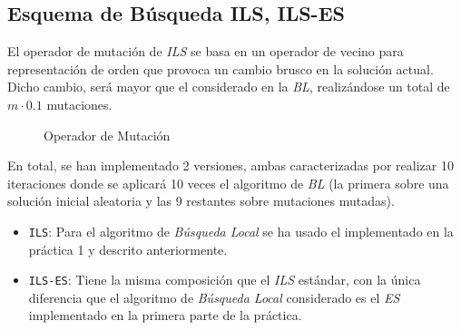 \subsection{Esquema de Búsqueda ILS, ILS-ES}



El operador de mutación de \textit{ILS} se basa en un operador de vecino para representación de orden que provoca un cambio brusco en la solución actual. Dicho cambio, será mayor que el considerado en la \textit{BL}, realizándose un total de $m \cdot 0.1$ mutaciones. 


\begin{figure}[H]
	\centering
	\begin{minipage}{.8\linewidth}
		
		
		
		\begin{algorithm}[H] 
			
			\caption{Operador de Mutación}
			\SetAlgoLined
			
			
			
		\end{algorithm} 
		
	\end{minipage}
\end{figure}

\newpage

En total, se han implementado 2 versiones, ambas caracterizadas por realizar 10 iteraciones donde se aplicará 10 veces el algoritmo de \textit{BL} (la primera sobre una solución inicial aleatoria y las 9 restantes sobre mutaciones mutadas).

\begin{itemize}
	\item \texttt{ILS}: Para el algoritmo de \textit{Búsqueda Local} se ha usado el implementado en la práctica 1 y descrito anteriormente.
	
	
	
	\item \texttt{ILS-ES}: Tiene la misma composición que el \textit{ILS} estándar, con la única diferencia que el algoritmo de \textit{Búsqueda Local} considerado es el \textit{ES} implementado en la primera parte de la práctica.
\end{itemize}

